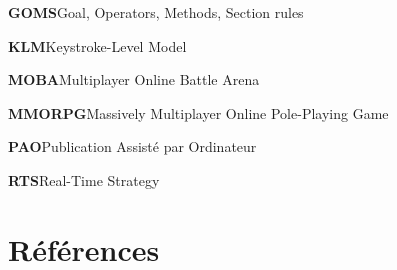 \documentclass[a4paper,12pt]{article}
\begin{document}
\textbf{\hypertarget{gls-177}{GOMS}}\hspace*{1em}Goal, Operators, Methods, Section rules\hspace*{.5em}\pageref{gls-3-use-1}

\textbf{\hypertarget{gls-198}{KLM}}\hspace*{1em}Keystroke-Level Model\hspace*{.5em}\pageref{gls-4-use-1}

\textbf{\hypertarget{gls-225}{MOBA}}\hspace*{1em}Multiplayer Online Battle Arena\hspace*{.5em}\pageref{gls-11-use-1}

\textbf{\hypertarget{gls-221}{MMORPG}}\hspace*{1em}Massively Multiplayer Online Pole-Playing Game\hspace*{.5em}\pageref{gls-8-use-1}

\textbf{\hypertarget{gls-246}{PAO}}\hspace*{1em}Publication Assisté par Ordinateur\hspace*{.5em}\pageref{gls-7-use-1}

\textbf{\hypertarget{gls-294}{RTS}}\hspace*{1em}Real-Time Strategy\hspace*{.5em}\pageref{gls-9-use-1}
\section{Références}
\label{sec:org8701713}
\printbibliography[heading=none]
\end{document}
